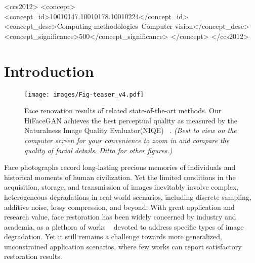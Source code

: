 \documentclass[sigconf]{acmart}
\begin{document}
\begin{CCSXML}
	<ccs2012>
	<concept>
	<concept_id>10010147.10010178.10010224</concept_id>
	<concept_desc>Computing methodologies~Computer vision</concept_desc>
	<concept_significance>500</concept_significance>
	</concept>
	</ccs2012>
\end{CCSXML}





\maketitle

\section{Introduction}

\begin{figure*}
\texttt{[image: images/Fig-teaser\_v4.pdf]}
	\caption{Face renovation results of related state-of-the-art methods. Our HiFaceGAN achieves the best perceptual quality as measured by the Naturalness Image Quality Evaluator(NIQE) ~\cite{niqe}. \emph{(Best to view on the computer screen for your convenience to zoom in and compare the quality of facial details. Ditto for other figures.)}
	}
	\label{fig:teaser}
\end{figure*}

Face photographs record long-lasting precious memories of individuals and historical moments of human civilization. Yet the limited conditions in the acquisition, storage, and transmission of images inevitably involve complex, heterogeneous degradations in real-world scenarios, including discrete sampling, additive noise, lossy compression, and beyond. With great application and research value, face restoration has been widely concerned by industry and academia, as a plethora of works ~\cite{ir_review}\cite{deblurring_survey}\cite{com_art_reduction_survey} devoted to address specific types of image degradation. Yet it still remains a challenge towards more generalized, unconstrained application scenarios, where few  works can report satisfactory restoration results.
\end{document}
